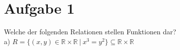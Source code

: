 \section*{Aufgabe 1}

Welche der folgenden Relationen stellen Funktionen dar?\\

a) $R = \{ (x,y) \in \mathbb{R} \times \mathbb{R} \ | \ x^3 = y^2 \} \subseteq \mathbb{R} \times \mathbb{R}$

\newpage